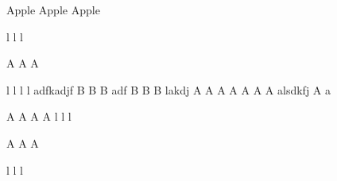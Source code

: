
 Apple Apple Apple 

 l l l 


 A A A

 l l l 
l 
adfkadjf B B 
 B   adf B B  B lakdj  
 A A A  A A A A alsdkfj A 
 a

A A A  A 
l l l
 

 

 A A A  

l l l


  